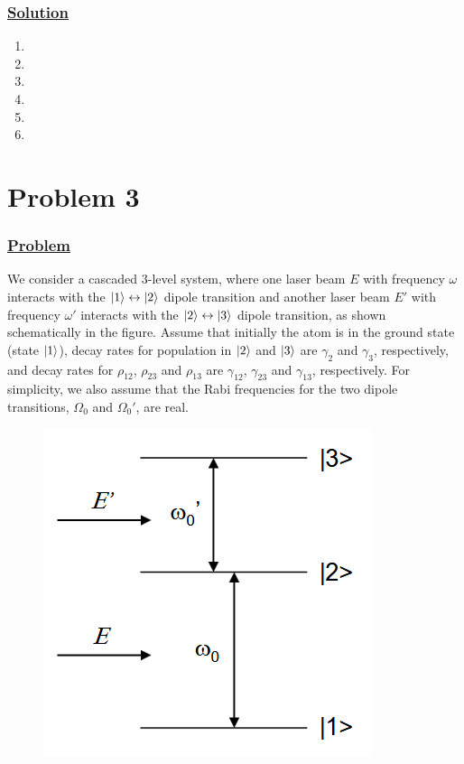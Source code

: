 \documentclass[12pt]{article}
\begin{document}
\subsubsection*{\underline{Solution}}
\begin{enumerate}[label=(\alph*)]
    \item 
    \item 
    \item 
    \item 
    \item  
    \item 
\end{enumerate}


\section*{Problem 3}
\subsubsection*{\underline{Problem}}
We consider a cascaded 3-level system, where one laser beam $E$ with frequency $\omega$ interacts with the $\ket{1}\leftrightarrow\ket{2}$ dipole transition and another laser beam $E'$ with frequency $\omega'$ interacts with the $\ket{2}\leftrightarrow\ket{3}$ dipole transition, as shown schematically in the figure.
Assume that initially the atom is in the ground state (state $\ket{1}$), decay rates for population in $\ket{2}$ and $\ket{3}$ are $\gamma_2$ and $\gamma_3$, respectively, and decay rates for $\rho_{12}$, $\rho_{23}$ and $\rho_{13}$ are $\gamma_{12}$, $\gamma_{23}$ and $\gamma_{13}$, respectively.
For simplicity, we also assume that the Rabi frequencies for the two dipole transitions, $\Omega_0$ and $\Omega_0'$, are real.
\begin{figure}[h]
    \centering
    \includegraphics[scale=.75]{cascade.png}
\end{figure}
\end{document}
